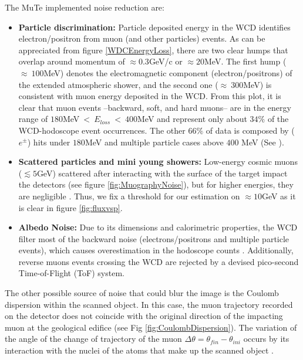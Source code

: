 \documentclass[letterpaper,10pt,titlepage,linenumber]{article}
\begin{document}
The MuTe implemented noise reduction are:
\begin{itemize}
    \item \textbf{Particle discrimination:} Particle deposited energy in the WCD identifies electron/positron from muon (and other particles) events. As can be appreciated from figure \ref{WDCEnergyLoss}, there are two clear humps that overlap around momentum of $\approx 0.3$GeV/c or $\approx20$MeV. The first hump ($\approx~100$MeV) denotes the electromagnetic component (electron/positrons) of the extended atmospheric shower, and the second one ($\approx~300$MeV) is consistent with muon energy deposited in the WCD.  From this plot, it is clear that muon events --backward, soft, and hard muons-- are in the energy range of $180$MeV$~<~E_{loss}~<~400$MeV and represent only about $34\%$ of the WCD-hodoscope event occurrences. The other 66$\%$ of data is composed by ($e^{\pm}$) hits under $180$MeV and multiple particle cases above $400$ MeV (See \cite{VasquezEtal2019,AsoreyEtal2015B}).
    
    \item \textbf{Scattered particles and mini young showers:} Low-energy cosmic muons ($\lesssim 5$GeV) scattered after interacting with the surface of the target impact the detectors (see figure \ref{fig:MuographyNoise}), but for higher energies, they are negligible \cite{GomezEtal2017}. Thus, we fix a threshold for our estimation on $\approx 10$GeV as it is clear in figure \ref{fig:fluxvsp}.
    
    \item \textbf{Albedo Noise:} Due to its dimensions and calorimetric properties, the WCD  filter most of the backward noise (electrons/positrons and multiple particle events), which causes overestimation in the hodoscope counts \cite{NishiyamaEtal2016}. Additionally, reverse muons events crossing the WCD are rejected by a devised pico-second Time-of-Flight (ToF) system.
\end{itemize} 

 The other possible source of noise that could blur the image is the Coulomb dispersion within the scanned object. In this case, the muon trajectory recorded on the detector does not coincide with the original direction of the impacting muon at the geological edifice (see Fig \ref{fig:CoulombDispersion}). The variation of the angle of the change of trajectory of the muon $\Delta \theta = \theta_{fin}-\theta_{ini}$ occurs by its interaction with the nuclei of the atoms that make up the scanned object \cite{FurlanEtal2013, PesenteEtal2009}.
    
\end{document}
